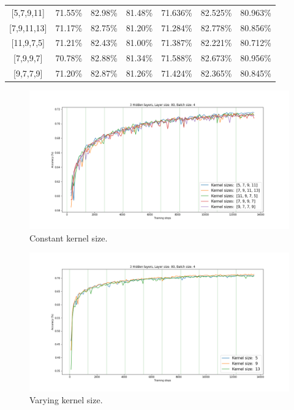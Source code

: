 \begin{table}[H]
\begin{tabular}{ccccccc}
\multicolumn{1}{c|}{{[}5,7,9,11{]}} & 71.55\% & 82.98\% & \multicolumn{1}{c|}{81.48\%} & 71.636\% & 82.525\% & 80.963\% \\
\multicolumn{1}{c|}{{[}7,9,11,13{]}} & 71.17\% & 82.75\% & \multicolumn{1}{c|}{81.20\%} & 71.284\% & 82.778\% & 80.856\% \\
\multicolumn{1}{c|}{{[}11,9,7,5{]}} & 71.21\% & 82.43\% & \multicolumn{1}{c|}{81.00\%} & 71.387\% & 82.221\% & 80.712\% \\
\multicolumn{1}{c|}{{[}7,9,9,7{]}} & 70.78\% & 82.88\% & \multicolumn{1}{c|}{81.34\%} & 71.588\% & 82.673\% & 80.956\% \\
\multicolumn{1}{c|}{{[}9,7,7,9{]}} & 71.20\% & 82.87\% & \multicolumn{1}{c|}{81.26\%} & 71.424\% & 82.365\% & 80.845\%
\end{tabular}
\end{table}
\begin{figure}[H]
  \centering
  \includegraphics[width=\linewidth]{../graphs/new/kernel_sizes_1}
  \caption{Constant kernel size.}
\end{figure}

\begin{figure}[H]
  \centering
  \includegraphics[width=\linewidth]{../graphs/new/kernel_sizes_2}
  \caption{Varying kernel size.}
\end{figure}

